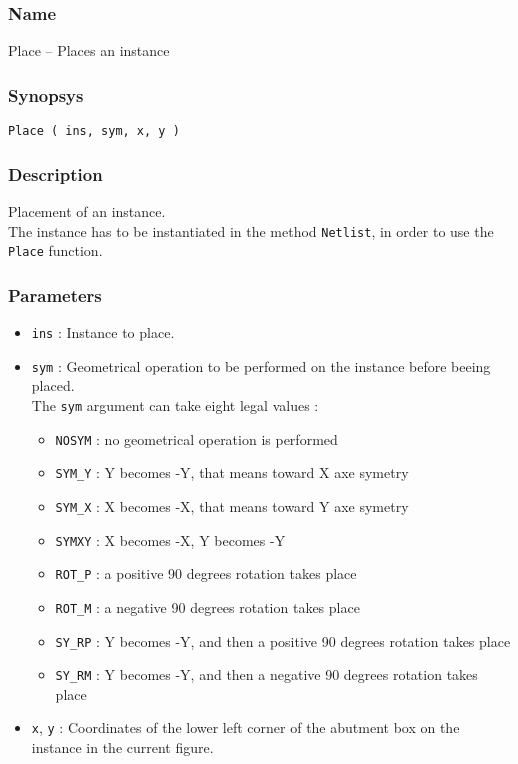 \subsubsection{Name}

Place -- Places an instance

\subsubsection{Synopsys}

\begin{verbatim}
Place ( ins, sym, x, y )
\end{verbatim}

\subsubsection{Description}

Placement of an instance.\\
\indent The instance has to be instantiated in the method \verb-Netlist-, in order to use the \verb-Place- function.
    
\subsubsection{Parameters}

\begin{itemize}
    \item \verb-ins- : Instance to place.
    \item \verb-sym- : Geometrical operation to be performed on the instance before beeing placed.\\The \verb-sym- argument can take eight legal values :
    \begin{itemize}
        \item \verb-NOSYM- : no geometrical operation is performed
        \item \verb-SYM_Y- : Y becomes -Y, that means toward X axe symetry
        \item \verb-SYM_X- : X becomes -X, that means toward Y axe symetry
        \item \verb-SYMXY- : X becomes -X, Y becomes -Y
        \item \verb-ROT_P- : a positive 90 degrees rotation takes place
        \item \verb-ROT_M- : a negative 90 degrees rotation takes place
        \item \verb-SY_RP- : Y becomes -Y, and then a positive 90 degrees rotation takes place
        \item \verb-SY_RM- : Y becomes -Y, and then a negative 90 degrees rotation takes place
    \end{itemize}
    \item \verb-x-, \verb-y- : Coordinates of the lower left corner of the abutment box on the instance in the current figure.
\end{itemize}
    
